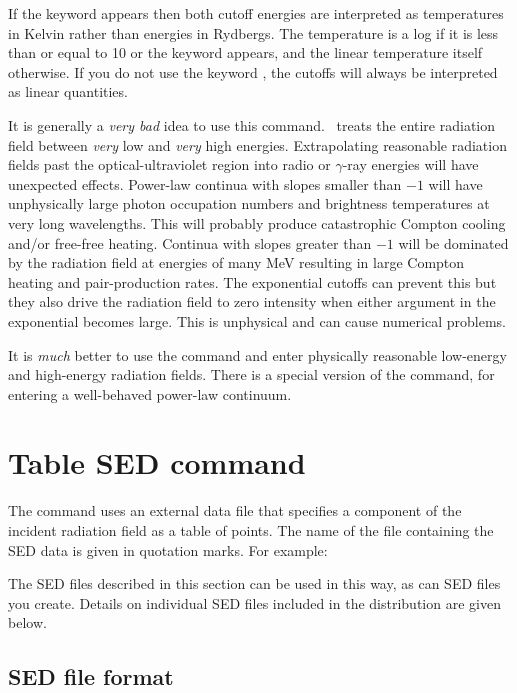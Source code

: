 If the keyword  appears then both cutoff energies
are interpreted
as temperatures in Kelvin rather than energies in Rydbergs.
The temperature
is a log if it is less than or equal to 10 or the keyword  appears,
and the linear temperature itself otherwise.
If you do not use the keyword , the cutoffs will always be
interpreted as linear quantities.

It is generally a \emph{very bad} idea to use this command.
\Cloudy\ treats the
entire radiation field between \emph{very} low and
\emph{very} high energies.
Extrapolating
reasonable radiation fields past the optical-ultraviolet region into
radio or $\gamma$-ray
energies will have unexpected effects.
Power-law continua with slopes
smaller than $-1$ will have unphysically large photon occupation numbers
and brightness temperatures at very long wavelengths.
This will probably produce
catastrophic Compton cooling and/or free-free heating.
Continua with slopes
greater than $-1$ will be dominated by the radiation field at energies of
many MeV resulting in large Compton heating and pair-production rates.
The exponential cutoffs can prevent this but they also drive the
radiation field
to zero intensity when either argument in the exponential becomes large.
This is unphysical and can cause numerical problems.

It is \emph{much} better to use the  command
and enter physically reasonable low-energy and high-energy radiation fields.
There is a special version of the command, 
for entering a well-behaved power-law continuum.

\section{Table SED command}
\label{sec:CommandTableSED}

The  command uses an external data file 
that specifies a component of the incident radiation field as a table of points.
The name of the file containing the SED data is given in quotation marks. For example:

\noindent
{}

\noindent
The SED files described in this section can be used in this way, 
as can SED files you create.
Details on individual SED files included in the distribution
are given below.

\subsection{SED file format}
\label{sec:SEDFormat}

